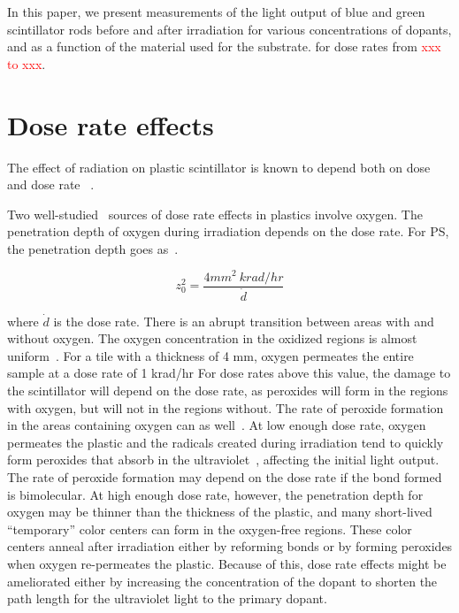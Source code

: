 \documentclass[review]{elsarticle}
\begin{document}
In this paper, we present measurements of the light output 
of blue and green scintillator rods 
before and after irradiation for various concentrations of dopants, and
as a function of the material used for the substrate.
for dose rates from \textcolor{red}{xxx to xxx}.


\section{Dose rate effects}

The effect of radiation on plastic scintillator is known to depend
both on dose and dose rate ~\cite{sauli,34504,Wick1991472,289295,173180,173178,Giokaris1993315,gillen,1748-0221-11-10-T10004}.  

Two well-studied~\cite{clough1,bolland1,bolland2,bateman,cunliffe,Wick1991472,Biagtan1996125}
sources of dose rate effects in plastics
involve oxygen.   The penetration depth of oxygen
during irradiation depends on the dose rate.
For PS, the penetration depth goes as~\cite{Wick1991472,cloughPS}.
\begin{linenomath}
\begin{equation}
z_0^2=\frac{4 mm^2~ krad/hr}{\dot{d}}
\label{eqn:z0}
\end{equation}
\end{linenomath}
where $\dot{d}$ is the dose rate.
There is an abrupt transition between areas with and without oxygen.  The
oxygen  concentration
in the oxidized regions is almost uniform~\cite{cloughPS}.
For a tile with a thickness of 4 mm, oxygen permeates the entire sample at
a dose rate of 1 krad/hr
For dose rates above this value, the damage to the scintillator
will depend on the dose rate, as peroxides will form in the regions
with oxygen, but will not in the regions without.
The rate of peroxide
formation in the areas containing oxygen can as well~\cite{clough1}.
At low enough dose rate, oxygen permeates the plastic 
and the radicals created during irradiation tend to quickly
form peroxides that absorb in the ultraviolet~\cite{clough1}, 
affecting the initial light output.  
The rate of peroxide formation may depend on the dose rate if the bond formed is bimolecular.
At high enough dose rate, however, the penetration depth for oxygen may
be thinner than the thickness of the plastic, and many short-lived ``temporary'' color centers can form in the oxygen-free regions.  
These color centers anneal after irradiation either by reforming bonds or by forming peroxides when oxygen re-permeates the plastic.
Because of this, dose rate effects might be ameliorated either by increasing the concentration of the dopant to shorten the path length for the ultraviolet light to the primary dopant.
\end{document}
